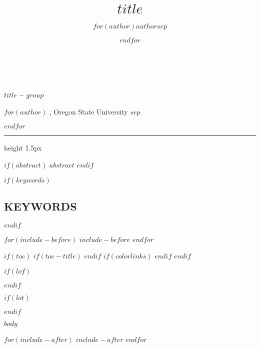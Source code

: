 \documentclass[9pt]{extarticle}
\title{$title$}
\author{$for(author)$$author$$sep$ \and $endfor$}
\date{}
\begin{document}
\thispagestyle{plain}


\textbf{ \\ \\
  \LARGE $title$ -- $group$
}

\vspace{2em}

{
  \setlength{\parskip}{0.3em}
  $for(author)$
  , Oregon State University
  $sep$

  $endfor$
}

\vspace{2em}
\hrule height 1.5px
\vspace{1em}

$if(abstract)$
\noindent \small $abstract$
$endif$

\normalsize

$if(keywords)$
\hypertarget{keywords}{%
\subsection{\normalsize KEYWORDS}\label{keywords}}

$endif$

$for(include-before)$
$include-before$
$endfor$

$if(toc)$
$if(toc-title)$
\renewcommand*\contentsname{$toc-title$}
$endif$
{
$if(colorlinks)$
\hypersetup{linkcolor=$if(toccolor)$$toccolor$$else$$endif$}
$endif$
\setcounter{tocdepth}{$toc-depth$}
\tableofcontents
}
$endif$

$if(lof)$
\listoffigures
$endif$

$if(lot)$
\listoftables
$endif$

$body$

$for(include-after)$
$include-after$
$endfor$
\end{document}
